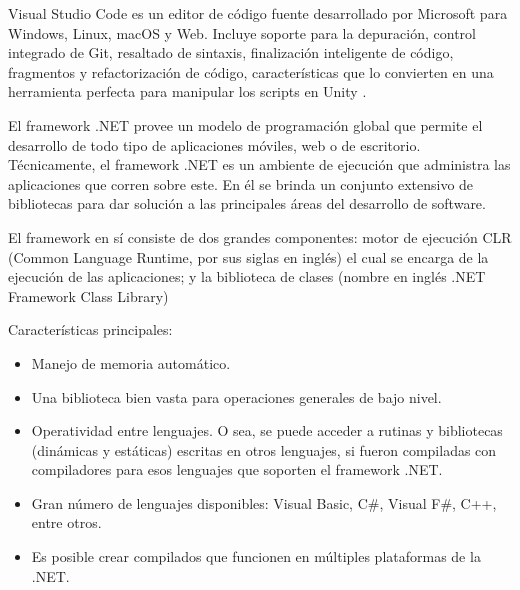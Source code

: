 Visual Studio Code es un editor de código fuente desarrollado por Microsoft para Windows, Linux, macOS y Web. Incluye soporte para la depuración, control integrado de Git, resaltado de sintaxis, finalización inteligente de código, fragmentos y refactorización de código, características que lo convierten en una herramienta perfecta para manipular los scripts en Unity \cite{vscode}.

El framework .NET provee un modelo de programación global que permite el desarrollo de todo tipo de aplicaciones móviles, web o de escritorio. Técnicamente, el framework .NET es un ambiente de ejecución que administra las aplicaciones que corren sobre este. En él se brinda un conjunto extensivo de bibliotecas para dar solución a las principales áreas del desarrollo de software.

El framework en sí consiste de dos grandes componentes: motor de ejecución CLR (Common Language Runtime, por sus siglas en inglés) el cual se encarga de la ejecución de las aplicaciones; y la biblioteca de clases (nombre en inglés .NET Framework Class Library)~\cite{netframework}

Características principales:
\begin{itemize}
    \item Manejo de memoria automático.
    \item Una biblioteca bien vasta para operaciones generales de bajo nivel.
    \item Operatividad entre lenguajes. O sea, se puede acceder a rutinas y bibliotecas (dinámicas y estáticas) escritas en otros lenguajes, si fueron compiladas con compiladores para esos lenguajes que soporten el framework .NET.
    \item Gran número de lenguajes disponibles: Visual Basic, C\#, Visual F\#, C++, entre otros.
    \item Es posible crear compilados que funcionen en múltiples plataformas de la .NET.
\end{itemize}